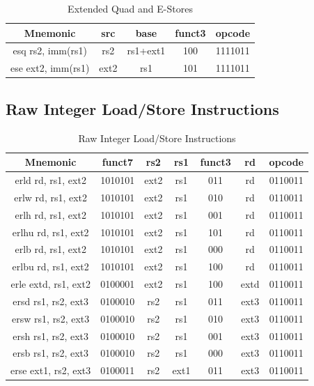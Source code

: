 \documentclass{article}
\begin{document}
\begin{center}
\begin{small}
\begin{table}[H]
\caption{Extended Quad and E-Stores}
\begin{center}
\begin{tabular}{| c | c | c | c | c | }
\hline
Mnemonic & src & base & funct3 & opcode \\ \hline
\hline
esq rs2, imm(rs1) & rs2 & rs1+ext1 & 100 & 1111011\\
\hline
ese ext2, imm(rs1) & ext2 & rs1 & 101 & 1111011\\
\hline
\end{tabular}
\end{center}
\end{table}

\end{small}
\end{center}

\newpage
\subsection{Raw Integer Load/Store Instructions}

\begin{center}
\begin{small}

\begin{table}[H]
\caption{Raw Integer Load/Store Instructions}
\begin{center}
\begin{tabular}{| c | c | c | c | c | c | c |}
\hline
Mnemonic & funct7 & rs2 & rs1 & funct3 & rd & opcode \\ \hline
\hline
erld rd, rs1, ext2 & 1010101 & ext2 & rs1 & 011 & rd & 0110011\\
\hline
erlw rd, rs1, ext2 & 1010101 & ext2 & rs1 & 010 & rd & 0110011\\
\hline
erlh rd, rs1, ext2 & 1010101 & ext2 & rs1 & 001 & rd & 0110011\\
\hline
erlhu rd, rs1, ext2 & 1010101 & ext2 & rs1 & 101 & rd & 0110011\\
\hline
erlb rd, rs1, ext2 & 1010101 & ext2 & rs1 & 000 & rd & 0110011\\
\hline
erlbu rd, rs1, ext2 & 1010101 & ext2 & rs1 & 100 & rd & 0110011\\
\hline
erle extd, rs1, ext2 & 0100001 & ext2 & rs1 & 100 & extd & 0110011\\
\hline
ersd rs1, rs2, ext3 & 0100010 &  rs2 & rs1 & 011 & ext3 & 0110011\\
\hline
ersw rs1, rs2, ext3 & 0100010 &  rs2 & rs1 & 010 & ext3 & 0110011\\
\hline
ersh rs1, rs2, ext3 & 0100010 &  rs2 & rs1 & 001 & ext3 & 0110011\\
\hline
ersb rs1, rs2, ext3 & 0100010 &  rs2 & rs1 & 000 & ext3 & 0110011\\
\hline
erse ext1, rs2, ext3 & 0100011 &  rs2 & ext1 & 011 & ext3 & 0110011\\
\hline
\end{tabular}
\end{center}
\end{table}

\end{small}
\end{center}
\end{document}
